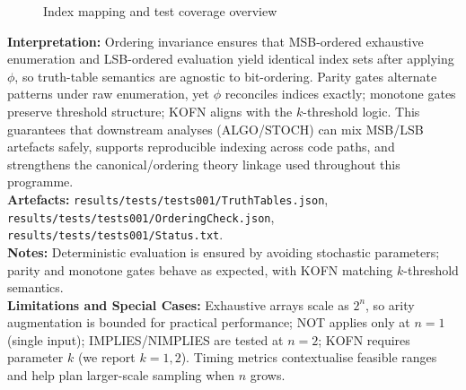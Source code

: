 \documentclass{article}
\begin{document}
\begin{figure}[h]
\centering
{}
\caption{Index mapping and test coverage overview}
\end{figure}
\textbf{Interpretation:} Ordering invariance ensures that MSB-ordered exhaustive enumeration and LSB-ordered evaluation yield identical index sets after applying $\phi$, so truth-table semantics are agnostic to bit-ordering. Parity gates alternate patterns under raw enumeration, yet $\phi$ reconciles indices exactly; monotone gates preserve threshold structure; KOFN aligns with the $k$-threshold logic. This guarantees that downstream analyses (ALGO/STOCH) can mix MSB/LSB artefacts safely, supports reproducible indexing across code paths, and strengthens the canonical/ordering theory linkage used throughout this programme.\\
\textbf{Artefacts:} \texttt{results/tests/tests001/TruthTables.json}, \texttt{results/tests/tests001/OrderingCheck.json}, \texttt{results/tests/tests001/Status.txt}.\\
\textbf{Notes:} Deterministic evaluation is ensured by avoiding stochastic parameters; parity and monotone gates behave as expected, with KOFN matching $k$-threshold semantics.
\\
\textbf{Limitations and Special Cases:} Exhaustive arrays scale as $2^n$, so arity augmentation is bounded for practical performance; NOT applies only at $n=1$ (single input); IMPLIES/NIMPLIES are tested at $n=2$; KOFN requires parameter $k$ (we report $k=1,2$). Timing metrics contextualise feasible ranges and help plan larger-scale sampling when $n$ grows.
\end{document}

